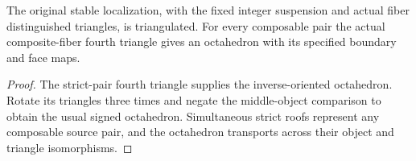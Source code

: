\begin{proposition}
  \label{prop:actual-source-triangulated}
  \leanok
  The original stable localization, with the fixed integer suspension and actual fiber distinguished triangles, is triangulated. For every composable pair the actual composite-fiber fourth triangle gives an octahedron with its specified boundary and face maps.
\end{proposition}
\begin{proof}
  The strict-pair fourth triangle supplies the inverse-oriented octahedron. Rotate its triangles three times and negate the middle-object comparison to obtain the usual signed octahedron. Simultaneous strict roofs represent any composable source pair, and the octahedron transports across their object and triangle isomorphisms.
  \leanok
\end{proof}

